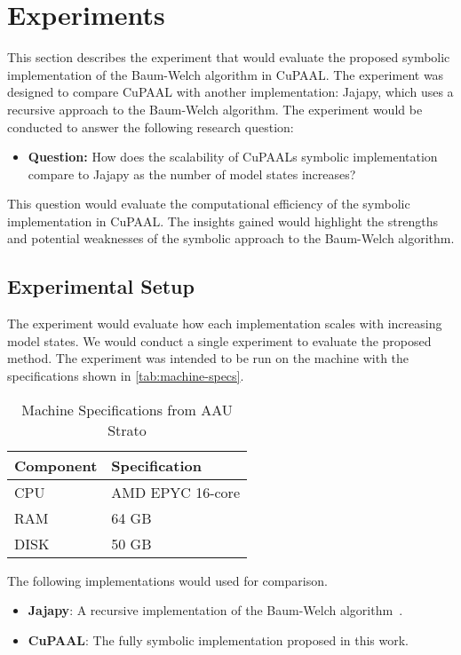 \section{Experiments}\label{sec:experiments}
This section describes the experiment that would evaluate the proposed symbolic implementation of the Baum-Welch algorithm in CuPAAL.
The experiment was designed to compare CuPAAL with another implementation: Jajapy, which uses a recursive approach to the Baum-Welch algorithm.
The experiment would be conducted to answer the following research question:

\begin{itemize}
\item \textbf{Question:} How does the scalability of CuPAALs symbolic implementation compare to Jajapy as the number of model states increases?
\end{itemize}

This question would evaluate the computational efficiency of the symbolic implementation in CuPAAL.
The insights gained would highlight the strengths and potential weaknesses of the symbolic approach to the Baum-Welch algorithm.

\subsection{Experimental Setup}
The experiment would evaluate how each implementation scales with increasing model states. 
We would conduct a single experiment to evaluate the proposed method.
The experiment was intended to be run on the machine with the specifications shown in \autoref{tab:machine-specs}. 
\begin{table}[htb!]
\centering
\caption{Machine Specifications from AAU Strato}
\label{tab:machine-specs}
    \begin{tabular}{ll}
        \toprule
        \textbf{Component} & \textbf{Specification} \\
        \midrule
        CPU & AMD EPYC 16-core \\
        RAM & 64 GB \\
        DISK & 50 GB \\
        \bottomrule
    \end{tabular}
\end{table}

The following implementations would used for comparison.

\begin{itemize}
\item \textbf{Jajapy}: A recursive implementation of the Baum-Welch algorithm~\cite{reynouard2023jajapy}.
\item \textbf{CuPAAL}: The fully symbolic implementation proposed in this work.
\end{itemize}

